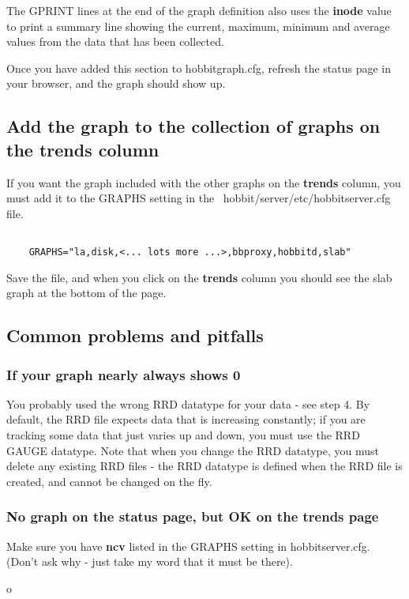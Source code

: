  The GPRINT lines at the end of the graph definition also uses the \textbf{inode}
 value to print a summary line showing the current, maximum, minimum and average values from the data that has been collected.


 Once you have added this section to hobbitgraph.cfg, refresh the status page in your browser, and the graph should show up.
\subsection{Add the graph to the collection of graphs on the trends column}


 If you want the graph included with the other graphs on the \textbf{trends}
 column, you must add it to the GRAPHS setting in the ~hobbit/server/etc/hobbitserver.cfg file.
\begin{verbatim}

	GRAPHS="la,disk,<... lots more ...>,bbproxy,hobbitd,slab"

\end{verbatim}
 Save the file, and when you click on the \textbf{trends}
 column you should see the slab graph at the bottom of the page. \subsection{Common problems and pitfalls}
\subsubsection{If your graph nearly always shows 0}


 You probably used the wrong RRD datatype for your data - see step 4. By default, the RRD file expects data that is increasing constantly; if you are tracking some data that just varies up and down, you must use the RRD GAUGE datatype. Note that when you change the RRD datatype, you must delete any existing RRD files - the RRD datatype is defined when the RRD file is created, and cannot be changed on the fly.
\subsubsection{No graph on the status page, but OK on the trends page}


 Make sure you have \textbf{ncv}
 listed in the GRAPHS setting in hobbitserver.cfg. (Don't ask why - just take my word that it must be there).

o
